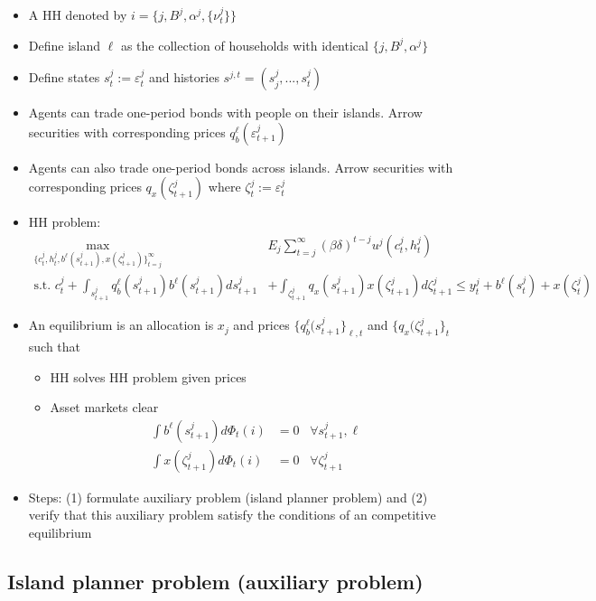 \documentclass{article}
\begin{document}
\begin{enumerate}
\begin{itemize}
\item A HH denoted by $i = \{j, B^j, \alpha^j, \{ \nu_t^j \}\}$
\item Define island $\ell$ as the collection of households with identical $\{j, B^j, \alpha^j\}$
\item Define states $s_t^j := \varepsilon_t^j$ and histories $s^{j,t} = (s_j^j, ..., s_t^j)$
\item Agents can trade one-period bonds with people on their islands. Arrow securities with corresponding prices $q_b^\ell(\varepsilon_{t+1}^j)$
\item Agents can also trade one-period bonds across islands. Arrow securities with corresponding prices $q_x(\zeta_{t+1}^j)$  where $\zeta_t^j := \varepsilon_t^j$
\item HH problem:
\begin{align*}
\max_{\{c_t^j, h_t^j, b^\ell(s_{t+1}^j), x (\zeta_{t+1}^j)\}_{t=j}^\infty} & E_j \sum_{t=j}^\infty (\beta \delta)^{t-j} u^j(c_t^j, h_t^j)\\
\text{s.t. } c_t^j + \int_{s_{t+1}^j} q_b^\ell(s_{t+1}^j) b^\ell(s_{t+1}^j) ds_{t+1}^j &+ \int_{\zeta_{t+1}^j} q_x(s_{t+1}^j) x(\zeta_{t+1}^j) d\zeta_{t+1}^j \le y_t^j + b^\ell(s_t^j) + x(\zeta_t^j)
\end{align*}
\item An equilibrium is an allocation is $x_j$ and prices $\{q_b^\ell(s_{t+1}^j\}_{\ell, t}$ and $\{q_x(\zeta_{t+1}^j\}_t$ such that
\begin{itemize}
\item HH solves HH problem given prices
\item Asset markets clear
\begin{align*}
\int b^\ell(s_{t+1}^j) d \Phi_t(i) &= 0 \;\;\; \forall s_{t+1}^j, \ell\\
\int x(\zeta_{t+1}^j) d \Phi_t(i) &= 0 \;\;\; \forall \zeta_{t+1}^j
\end{align*}
\end{itemize}
\item Steps: (1) formulate auxiliary problem (island planner problem) and (2) verify that this auxiliary problem satisfy the conditions of an competitive equilibrium
\end{itemize}

\subsection*{Island planner problem (auxiliary problem)}


\end{enumerate}
\end{document}
